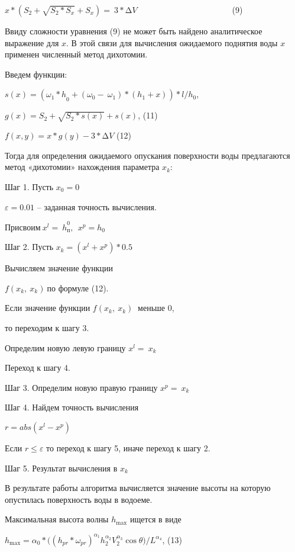 \documentclass[
]{article}
\begin{document}
\(x*\left( S_{2} + \sqrt{S_{2}*S_{x}} + S_{x} \right) = \ 3*\mathrm{\Delta}V\ \ \ \ \ \ \ \ \ \ \ \ \ \ \ \ \ \ \ \ \ \ \ \ \ \ \ \ \ \ \ \ \ \ \ \ \ \ \ \ \ \ \ \ \ \ \ \ \ \ \ \ \)(9)

Ввиду сложности уравнения (9) не может быть найдено аналитическое
выражение для \(x\). В этой связи для вычисления ожидаемого поднятия
воды \(x\ \)применен численный метод дихотомии.

Введем функции\(:\)

\(s(x) = \left( {\omega_{1}*h}_{0} + \left( \omega_{0} - \ \omega_{1} \right)*\left( h_{1} + x \right) \right)*l/h_{0}\),

\(g(x) = S_{2} + \sqrt{S_{2}*s(x)} + s(x)\), (11)

\(f(x,y) = x*g(y) - 3*\mathrm{\Delta}V\) (12)

Тогда для определения ожидаемого опускания поверхности воды предлагаются
метод «дихотомии» нахождения параметра \(x_{k}:\)

Шаг 1. Пусть \(x_{0} = 0\)

\(\varepsilon = 0.01\) -- заданная точность вычисления.

Присвоим\(\ {x^{l} = \ h}_{п}^{0},\ {\ x}^{p} = h_{0}\)

Шаг 2. Пусть \(x_{k} = \left( x^{l} + x^{p} \right)*0.5\)

Вычисляем значение функции

\(f\left( x_{k},\ x_{k} \right)\ \)по формуле (12).

Если значение функции \(f\left( x_{k},\ x_{k} \right)\ \) меньше 0,

то переходим к шагу 3.

Определим новую левую границу \(x^{l} = \ x_{k}\)

Переход к шагу 4.

Шаг 3. Определим новую правую границу \(x^{p} = \ x_{k}\)

Шаг 4. Найдем точность вычисления

\(r = abs\left( x^{l} - x^{p} \right)\)

Если \(r \leq \varepsilon\) то переход к шагу 5, иначе переход к шагу 2.

Шаг 5. Результат вычисления в \(x_{k}\)

В результате работы алгоритма вычисляется значение высоты на которую
опустилась поверхность воды в водоеме.

Максимальная высота волны \(h_{\max}\) ищется в виде

\(h_{\max} = \alpha_{0}*(\left( h_{pr}*\omega_{pr} \right)^{\alpha_{1}}h_{2}^{\alpha_{2}}V_{2}^{\alpha_{3}}\cos{\theta)/L^{\alpha_{4}}}\),
(13)
\end{document}
